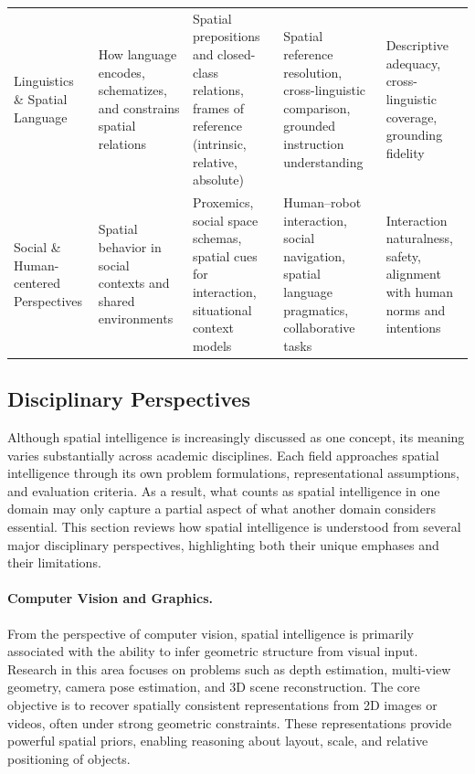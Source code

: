 \begin{table}[t]
\begin{tabular}{p{2.5cm} p{3cm} p{3cm} p{3cm} p{}}
Linguistics \& Spatial Language &
How language encodes, schematizes, and constrains spatial relations &
Spatial prepositions and closed-class relations, frames of reference (intrinsic, relative, absolute) &
Spatial reference resolution, cross-linguistic comparison, grounded instruction understanding &
Descriptive adequacy, cross-linguistic coverage, grounding fidelity \\
\addlinespace[2pt]
\hline
\addlinespace[2pt]

Social \& Human-centered Perspectives &
Spatial behavior in social contexts and shared environments &
Proxemics, social space schemas, spatial cues for interaction, situational context models &
Human--robot interaction, social navigation, spatial language pragmatics, collaborative tasks &
Interaction naturalness, safety, alignment with human norms and intentions \\
\bottomrule
\end{tabular}
\label{tab:p1_s2_1_si-disciplinary-landscape}
\end{table}





\subsection{Disciplinary Perspectives}
\label{subsec:p1-sec2-disciplinary-perspectives}

Although spatial intelligence is increasingly discussed as one concept, its meaning varies substantially across academic disciplines.
Each field approaches spatial intelligence through its own problem formulations, representational assumptions, and evaluation criteria.
As a result, what counts as spatial intelligence in one domain may only capture a partial aspect of what another domain considers essential.
This section reviews how spatial intelligence is understood from several major disciplinary perspectives, highlighting both their unique emphases and their limitations.




\paragraph{Computer Vision and Graphics.}
From the perspective of computer vision, spatial intelligence is primarily associated with the ability to infer geometric structure from visual input.
Research in this area focuses on problems such as depth estimation, multi-view geometry, camera pose estimation, and 3D scene reconstruction.
The core objective is to recover spatially consistent representations from 2D images or videos, often under strong geometric constraints.
These representations provide powerful spatial priors, enabling reasoning about layout, scale, and relative positioning of objects.



